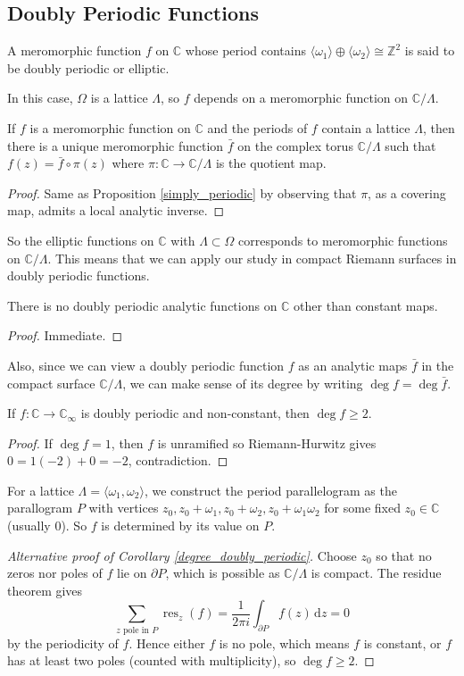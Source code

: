 \subsection{Doubly Periodic Functions}
\begin{definition}
    A meromorphic function $f$ on $\mathbb C$ whose period contains $\langle\omega_1\rangle\oplus\langle\omega_2\rangle\cong\mathbb Z^2$ is said to be doubly periodic or elliptic.
\end{definition}
In this case, $\Omega$ is a lattice $\Lambda$, so $f$ depends on a meromorphic function on $\mathbb C/\Lambda$.
\begin{proposition}
    If $f$ is a meromorphic function on $\mathbb C$ and the periods of $f$ contain a lattice $\Lambda$, then there is a unique meromorphic function $\bar{f}$ on the complex torus $\mathbb C/\Lambda$ such that $f(z)=\bar{f}\circ\pi(z)$ where $\pi:\mathbb C\to\mathbb C/\Lambda$ is the quotient map.
\end{proposition}
\begin{proof}
    Same as Proposition \ref{simply_periodic} by observing that $\pi$, as a covering map, admits a local analytic inverse.
\end{proof}
So the elliptic functions on $\mathbb C$ with $\Lambda\subset\Omega$ corresponds to meromorphic functions on $\mathbb C/\Lambda$.
This means that we can apply our study in compact Riemann surfaces in doubly periodic functions.
\begin{corollary}
    There is no doubly periodic analytic functions on $\mathbb C$ other than constant maps.
\end{corollary}
\begin{proof}
    Immediate.
\end{proof}
Also, since we can view a doubly periodic function $f$ as an analytic maps $\bar{f}$ in the compact surface $\mathbb C/\Lambda$, we can make sense of its degree by writing $\deg f=\deg\bar{f}$.
\begin{corollary}\label{degree_doubly_periodic}
    If $f:\mathbb C\to\mathbb C_\infty$ is doubly periodic and non-constant, then $\deg f\ge 2$.
\end{corollary}
\begin{proof}
    If $\deg f=1$, then $f$ is unramified so Riemann-Hurwitz gives $0=1(-2)+0=-2$, contradiction.
\end{proof}
For a lattice $\Lambda=\langle\omega_1,\omega_2\rangle$, we construct the period parallelogram as the parallogram $P$ with vertices $z_0,z_0+\omega_1,z_0+\omega_2,z_0+\omega_1\omega_2$ for some fixed $z_0\in\mathbb C$ (usually $0$).
So $f$ is determined by its value on $P$.
\begin{proof}[Alternative proof of Corollary \ref{degree_doubly_periodic}]
    Choose $z_0$ so that no zeros nor poles of $f$ lie on $\partial P$, which is possible as $\mathbb C/\Lambda$ is compact.
    The residue theorem gives
    $$\sum_{z\text{ pole in }P}\operatorname{res}_z(f)=\frac{1}{2\pi i}\int_{\partial P}f(z)\,\mathrm dz=0$$
    by the periodicity of $f$.
    Hence either $f$ is no pole, which means $f$ is constant, or $f$ has at least two poles (counted with multiplicity), so $\deg f\ge 2$.
\end{proof}